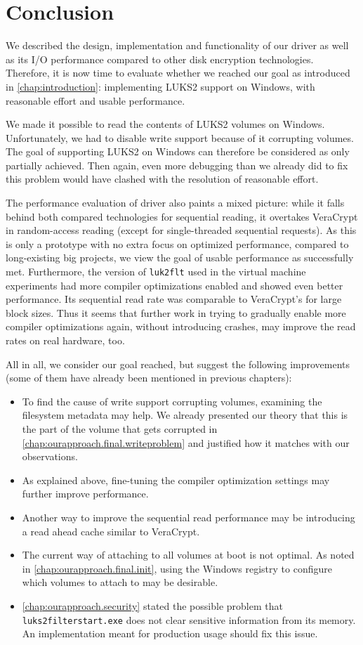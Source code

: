\chapter{Conclusion}
\label{chap:conclusion}
We described the design, implementation and functionality of our driver as well as its I/O performance compared to other disk encryption technologies. Therefore, it is now time to evaluate whether we reached our goal as introduced in \autoref{chap:introduction}: implementing LUKS2 support on Windows, with reasonable effort and usable performance.

We made it possible to read the contents of LUKS2 volumes on Windows. Unfortunately, we had to disable write support because of it corrupting volumes. The goal of supporting LUKS2 on Windows can therefore be considered as only partially achieved. Then again, even more debugging than we already did to fix this problem would have clashed with the resolution of reasonable effort.

The performance evaluation of driver also paints a mixed picture: while it falls behind both compared technologies for sequential reading, it overtakes VeraCrypt in random-access reading (except for single-threaded sequential requests). As this is only a prototype with no extra focus on optimized performance, compared to long-existing big projects, we view the goal of usable performance as successfully met. Furthermore, the version of \texttt{luk2flt} used in the virtual machine experiments had more compiler optimizations enabled and showed even better performance. Its sequential read rate was comparable to VeraCrypt's for large block sizes. Thus it seems that further work in trying to gradually enable more compiler optimizations again, without introducing crashes, may improve the read rates on real hardware, too.

All in all, we consider our goal reached, but suggest the following improvements (some of them have already been mentioned in previous chapters):
\begin{itemize}
	\item To find the cause of write support corrupting volumes, examining the filesystem metadata may help. We already presented our theory that this is the part of the volume that gets corrupted in \autoref{chap:ourapproach.final.writeproblem} and justified how it matches with our observations.
	\item As explained above, fine-tuning the compiler optimization settings may further improve performance.
	\item Another way to improve the sequential read performance may be introducing a read ahead cache similar to VeraCrypt.
	\item The current way of attaching to all volumes at boot is not optimal. As noted in \autoref{chap:ourapproach.final.init}, using the Windows registry to configure which volumes to attach to may be desirable.
	\item \autoref{chap:ourapproach.security} stated the possible problem that \texttt{luks2filterstart.exe} does not clear sensitive information from its memory. An implementation meant for production usage should fix this issue.
\end{itemize}

